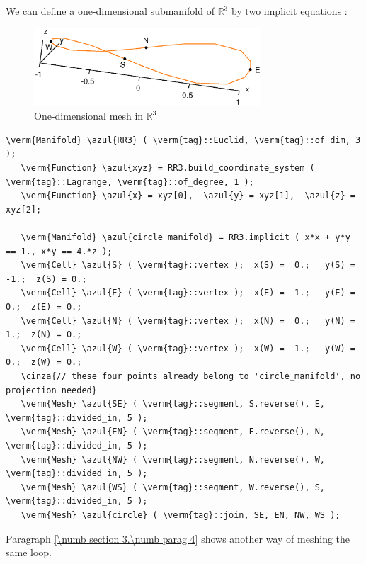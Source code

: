 We can define a one-dimensional submanifold of $ \mathbb{R}^3 $ by two implicit equations :
\medskip

\begin{figure}[ht] \centering
  \includegraphics[width=85mm]{circle-3d}
  \caption{One-dimensional mesh in $ {\mathbb R}^3 $}
  \label{\numb section 2.\numb fig 14}
\end{figure}

\begin{Verbatim}[commandchars=\\\{\},formatcom=\small\tt,frame=single,
   label=parag-\ref{\numb section 2.\numb parag 11}.cpp,rulecolor=\color{coment},
   baselinestretch=0.94,framesep=2mm]
   \verm{Manifold} \azul{RR3} ( \verm{tag}::Euclid, \verm{tag}::of_dim, 3 );
   \verm{Function} \azul{xyz} = RR3.build_coordinate_system ( \verm{tag}::Lagrange, \verm{tag}::of_degree, 1 );
   \verm{Function} \azul{x} = xyz[0],  \azul{y} = xyz[1],  \azul{z} = xyz[2];

   \verm{Manifold} \azul{circle_manifold} = RR3.implicit ( x*x + y*y == 1., x*y == 4.*z );
   \verm{Cell} \azul{S} ( \verm{tag}::vertex );  x(S) =  0.;   y(S) = -1.;  z(S) = 0.;
   \verm{Cell} \azul{E} ( \verm{tag}::vertex );  x(E) =  1.;   y(E) =  0.;  z(E) = 0.;
   \verm{Cell} \azul{N} ( \verm{tag}::vertex );  x(N) =  0.;   y(N) =  1.;  z(N) = 0.;
   \verm{Cell} \azul{W} ( \verm{tag}::vertex );  x(W) = -1.;   y(W) =  0.;  z(W) = 0.;
   \cinza{// these four points already belong to 'circle_manifold', no projection needed}
   \verm{Mesh} \azul{SE} ( \verm{tag}::segment, S.reverse(), E, \verm{tag}::divided_in, 5 );
   \verm{Mesh} \azul{EN} ( \verm{tag}::segment, E.reverse(), N, \verm{tag}::divided_in, 5 );
   \verm{Mesh} \azul{NW} ( \verm{tag}::segment, N.reverse(), W, \verm{tag}::divided_in, 5 );
   \verm{Mesh} \azul{WS} ( \verm{tag}::segment, W.reverse(), S, \verm{tag}::divided_in, 5 );
   \verm{Mesh} \azul{circle} ( \verm{tag}::join, SE, EN, NW, WS );
\end{Verbatim}

Paragraph \ref{\numb section 3.\numb parag 4} shows another way of meshing the same loop.


